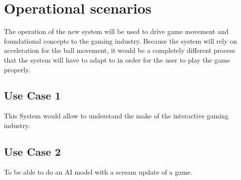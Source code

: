 
\chapter{Operational scenarios}
\label{loc:Operational scenarios}
% 

The operation of the new system will be used to drive game movement and foundational concepts to the gaming industry. Because the system will rely on acceleration for the ball movement, it would be a completely different process that the system will have to adapt to in order for the user to play the game properly.




\section{Use Case 1}
\label{loc:UseCase1}
% 

This System would allow to understand the make of the interactive gaming industry.

\section{Use Case 2}
\label{loc:UseCase2}
%

To be able to do an AI model with a scream update of a game.